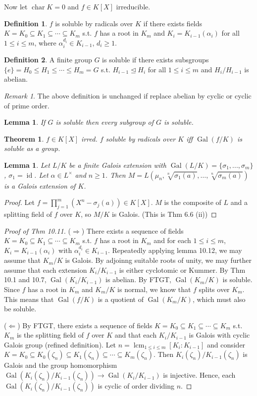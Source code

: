 \documentclass{article}
\theoremstyle{definition}
\newtheorem*{defn*}{Definition}
\theoremstyle{remark}
\newtheorem{rem}{Remark}
\theoremstyle{plain}
\newtheorem{lem}[defn]{Lemma}
\newtheorem{thm}[defn]{Theorem}
\newcommand{\Gal}{\operatorname{Gal}}
\begin{document}
Now let $\operatorname{char}K=0$ and $f\in K[X]$ irreducible.
\begin{defn*}
    $f$ is soluble by radicals over $K$ if there exists fields $K=K_0\subseteq K_1\subseteq \cdots\subseteq K_m$ s.t. $f$ has a root in $K_m$ and $K_i=K_{i-1}(\alpha_i)$ for all $1\le i\le m$, where $\alpha_i^{d_i}\in K_{i-1}$, $d_i\ge 1$.
\end{defn*}
\begin{defn*}
    A finite group $G$ is soluble if there exists subsgroups $\{e\}=H_0\le H_1\le \cdots\le H_m=G$ s.t. $H_{i-1}\trianglelefteq H_i$ for all $1\le i\le m$ and $H_i/H_{i-1}$ is abelian.
\end{defn*}
\begin{rem}
    The above definition is unchanged if replace abelian by cyclic or cyclic of prime order.
\end{rem}
\begin{lem}
    If $G$ is soluble then every subgroup of $G$ is soluble.
\end{lem}
\begin{thm}
    $f\in K[X]$ irred. $f$ soluble by radicals over $K$ iff $\Gal(f/K)$ is soluble as a group.
\end{thm}
\begin{lem}
    Let $L/K$ be a finite Galois extension with $\Gal(L/K)=\{\sigma_1,...,\sigma_m\}$, $\sigma_1=\operatorname{id}$. Let $\alpha\in L^\times$ and $n\ge 1$. Then $M=L(\mu_n,\sqrt[n]{\sigma_1(a)},\ldots,\sqrt[n]{\sigma_m(a)})$ is a Galois extension of $K$.
\end{lem}
\begin{proof}
    Let $f=\prod_{j=1}^m(X^n-\sigma_j(a))\in K[X]$. $M$ is the composite of $L$ and a splitting field of $f$ over $K$, so $M/K$ is Galois. (This is Thm 6.6 (ii))
\end{proof}
\begin{proof}[Proof of Thm 10.11]
    ($\Rightarrow$) There exists a sequence of fields $K=K_0\subseteq K_1\subseteq\cdots\subseteq K_m$ s.t. $f$ has a root in $K_m$ and for each $1\le i\le m$, $K_i=K_{i-1}(\alpha_i)$ with $\alpha_i^{d_i}\in K_{i-1}$. Repeatedly applying lemma 10.12, we may assume that $K_m/K$ is Galois. By adjoinng suitable roots of unity, we may further assume that each extension $K_i/K_{i-1}$ is either cyclotomic or Kummer. By Thm 10.1 and 10.7, $\Gal(K_i/K_{i-1})$ is abelian. By FTGT, $\Gal(K_m/K)$ is soluble. Since $f$ has a root in $K_m$ and $K_m/K$ is normal, we know that $f$ splits over $K_m$. This means that $\Gal(f/K)$ is a quotient of $\Gal(K_m/K)$, which must also be soluble.

    ($\Leftarrow$) By FTGT, there exists a sequence of fields $K=K_0\subseteq K_1\subseteq\cdots\subseteq K_m$ s.t. $K_m$ is the splitting field of $f$ over $K$ and that each $K_i/K_{i-1}$ is Galois with cyclic Galois group (refined definition). Let $n=\operatorname{lcm}_{1\le i\le m}[K_i:K_{i-1}]$ and consider $K=K_0\subseteq K_0(\zeta_n)\subseteq K_1(\zeta_n)\subseteq\cdots\subseteq K_m(\zeta_n)$. Then $K_i(\zeta_n)/K_{i-1}(\zeta_n)$ is Galois and the group homomorphism $\Gal(K_i(\zeta_n)/K_{i-1}(\zeta_n))\to \Gal(K_i/K_{i-1})$ is injective. Hence, each $\Gal(K_i(\zeta_n)/K_{i-1}(\zeta_n))$ is cyclic of order dividing $n$.
\end{proof}
\end{document}
